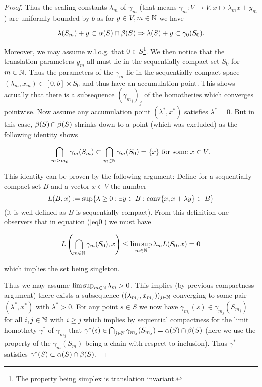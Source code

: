\documentclass{article}
\begin{document}
\begin{proof}
Thus the scaling constants $\lambda_m$ of $\gamma_m$ (that means $\gamma_m:V\to V,x\mapsto \lambda_m x+y_m
$) are uniformly bounded by $b$ as for $y\in V,m\in\mathbb{N}$ we have

\begin{equation}
\lambda(S_m)+y\subset \alpha(S)\cap\beta(S) \Rightarrow \lambda(S)+y\subset \gamma_0(S_0)\text{.}
\end{equation}

Moreover, we may assume w.l.o.g. that $0\in S$\footnote{The property being simplex is translation invariant.}. We then notice that the translation parameters $y_m$ all must lie in the sequentially compact set $S_0$ for $m\in\mathbb{N}$. Thus the parameters of the $\gamma_m$ lie in the sequentially compact space $(\lambda_m,x_m)\in[0,b]\times S_0$ and thus have an accumulation point. This shows actually that there is a subsequence $(\gamma_{m_j})_j$ of the homotheties which converges pointwise. Now assume any accumulation point $(\lambda^*,x^*)$ satisfies $\lambda^*=0$. But in this case, $\beta(S)\cap\beta(S)$ shrinks down to a point (which was excluded) as the following identity shows

\begin{equation}
\bigcap_{m\geq m_0}{\gamma_m(S_m)}\subset \bigcap_{m\in\mathbb{N}}{\gamma_m(S_0)} = \{x\}\text{ for some } x\in V\text{.}\label{eq0}
\end{equation} 

This identity can be proven by the following argument: Define for a sequentially compact set $B$ and a vector $x\in V$ the number 
\begin{equation}
L(B,x):=\sup\{\lambda\geq 0:\exists y\in B:\operatorname{conv}\{x,x+\lambda y\}\subset B\}
\end{equation}
(it is well-defined as $B$ is sequentially compact). From this definition one observers that in equation (\ref{eq0}) we must have 

\begin{equation}
L\left(\bigcap_{m\in\mathbb{N}}{\gamma_m(S_0)},x\right) \leq\limsup_{m\in\mathbb{N}}{\lambda_m}L(S_0,x)=0
\end{equation}

which implies the set being singleton.

Thus we may assume $\limsup_{m\in\mathbb{N}}{\lambda_m}>0$. This implies (by previous compactness argument) there exists a subsequence $((\lambda_{m_j},x_{m_j}))_{j\in\mathbb{N}}$ converging to some pair $(\lambda^*,x^*)$ with $\lambda^*>0$. For any point $s\in S$ we now have $\gamma_{m_i}(s)\in\gamma_{m_j}(S_{m_j})$ for all $i,j\in\mathbb{N}$ with $i\geq j$ which implies by sequential compactness for the limit homothety $\gamma^*$ of $\gamma_{m_j}$ that $\gamma^*(s)\in \bigcap_{j\in\mathbb{N}}{\gamma_{m_j}(S_{m_j})}=\alpha(S)\cap\beta(S)$ (here we use the property of the $\gamma_m(S_m)$ being a chain with respect to inclusion). Thus $\gamma^*$ satisfies $\gamma^*(S)\subset\alpha(S)\cap\beta(S)$. 


\end{proof}
\end{document}
